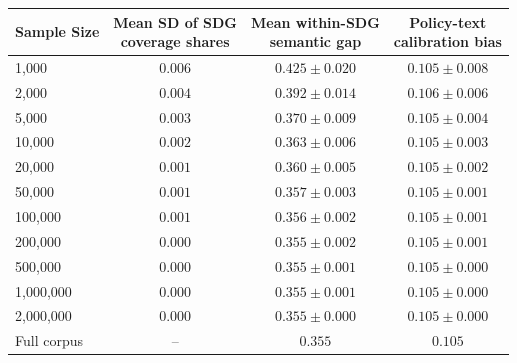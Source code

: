 \begin{tabular}{lccc}
\toprule
Sample Size & \shortstack{Mean SD of SDG\\coverage shares} & \shortstack{Mean within-SDG\\semantic gap} & \shortstack{Policy-text\\calibration bias} \\
\midrule
1,000 & $0.006$ & $0.425 \pm 0.020$ & $0.105 \pm 0.008$ \\
2,000 & $0.004$ & $0.392 \pm 0.014$ & $0.106 \pm 0.006$ \\
5,000 & $0.003$ & $0.370 \pm 0.009$ & $0.105 \pm 0.004$ \\
10,000 & $0.002$ & $0.363 \pm 0.006$ & $0.105 \pm 0.003$ \\
20,000 & $0.001$ & $0.360 \pm 0.005$ & $0.105 \pm 0.002$ \\
50,000 & $0.001$ & $0.357 \pm 0.003$ & $0.105 \pm 0.001$ \\
100,000 & $0.001$ & $0.356 \pm 0.002$ & $0.105 \pm 0.001$ \\
200,000 & $0.000$ & $0.355 \pm 0.002$ & $0.105 \pm 0.001$ \\
500,000 & $0.000$ & $0.355 \pm 0.001$ & $0.105 \pm 0.000$ \\
1,000,000 & $0.000$ & $0.355 \pm 0.001$ & $0.105 \pm 0.000$ \\
2,000,000 & $0.000$ & $0.355 \pm 0.000$ & $0.105 \pm 0.000$ \\
Full corpus & -- & $0.355$ & $0.105$ \\
\bottomrule
\end{tabular}
